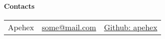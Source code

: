 \paragraph{Contacts} \label{sec:contacts}

\begin{table}[h!t]
\begin{tabular}{|C|C|C|}
\hline
{}
 &  &  \\
\hline
Apehex & \href{mailto:some@mail.com}{some@mail.com} & \href{https://github.com/apehex}{Github: apehex} \\
\hline
\end{tabular}
\end{table}
